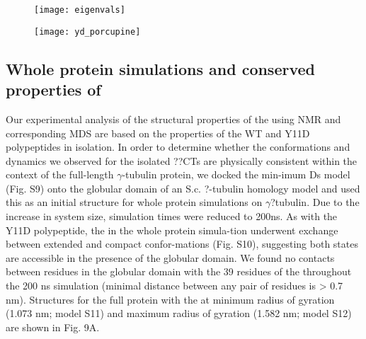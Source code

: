 \begin{figure}
\centering
	\texttt{[image: eigenvals]}
	\label{fig:eigenvalues}
\end{figure}

\begin{figure}
	\thispagestyle{empty}
	\centering     %
	\clearpage
	\label{fig:pca}
\end{figure}




\begin{figure}
\texttt{[image: yd\_porcupine]}
\label{fig:porcupine}
\end{figure}  


\subsection{Whole protein simulations and conserved properties of \gct}

Our experimental analysis of the structural properties of the \gct using NMR and corresponding MDS are based on the properties of the WT and Y11D \gct polypeptides in isolation. In order to determine whether the conformations and dynamics we observed for the isolated ??CTs are physically consistent within the context of the full-length $\gamma$-tubulin protein, we docked the min-imum Ds \gct model (Fig. S9) onto the globular domain of an S.c. ?-tubulin homology model and used this as an initial structure for whole protein simulations on $\gamma$?tubulin. Due to the increase in system size, simulation times were reduced to 200ns.  As with the Y11D \gct polypeptide, the \gct in the whole protein simula-tion underwent exchange between extended and compact confor-mations (Fig. S10), suggesting both states are accessible in the presence of the globular domain. We found no contacts between residues in the globular domain with the 39 residues of the \gct throughout the 200 ns simulation (minimal distance between any pair of residues is > 0.7 nm). Structures for the full protein with the \gct at minimum radius of gyration (1.073 nm; model S11) and maximum radius of gyration (1.582 nm; model S12) are shown in Fig. 9A.


